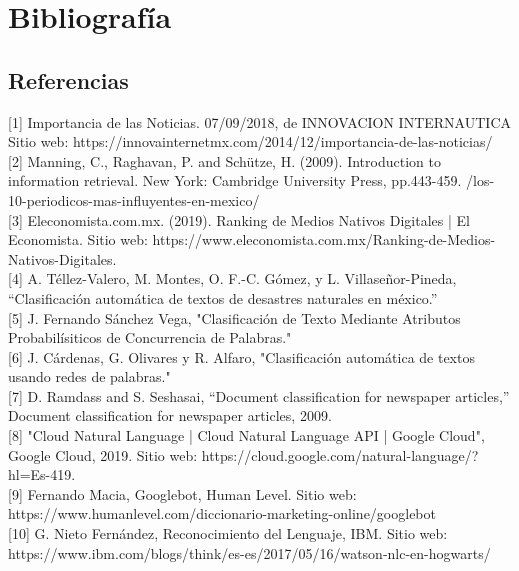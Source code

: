

\chapter{Bibliografía}

\section{Referencias}


[1] Importancia de las Noticias. 07/09/2018, de INNOVACION INTERNAUTICA Sitio web: https://innovainternetmx.com/2014/12/importancia-de-las-noticias/ \\

[2] Manning, C., Raghavan, P. and Schütze, H. (2009). Introduction to information retrieval. New York: Cambridge University Press, pp.443-459.
/los-10-periodicos-mas-influyentes-en-mexico/\\

[3] Eleconomista.com.mx. (2019). Ranking de Medios Nativos Digitales | El Economista. Sitio web: https://www.eleconomista.com.mx/Ranking-de-Medios-Nativos-Digitales.\\

[4] A. Téllez-Valero, M. Montes, O. F.-C. Gómez, y L. Villaseñor-Pineda, “Clasificación automática de textos de desastres naturales en méxico.”\\

[5] J. Fernando Sánchez Vega, "Clasificación de Texto Mediante Atributos Probabilísiticos de Concurrencia de Palabras."\\

[6] J. Cárdenas, G. Olivares y R. Alfaro, "Clasificación automática de textos usando redes de palabras."\\

[7] D. Ramdass and S. Seshasai, “Document classification for newspaper articles,” Document classification for newspaper articles, 2009.\\

[8] "Cloud Natural Language  |  Cloud Natural Language API  |  Google Cloud", Google Cloud, 2019. Sitio web: https://cloud.google.com/natural-language/?hl=Es-419.\\

[9] Fernando Macia, Googlebot, Human Level. Sitio web: https://www.humanlevel.com/diccionario-marketing-online/googlebot\\

[10] G. Nieto Fernández, Reconocimiento del Lenguaje, IBM. Sitio web: https://www.ibm.com/blogs/think/es-es/2017/05/16/watson-nlc-en-hogwarts/\\

